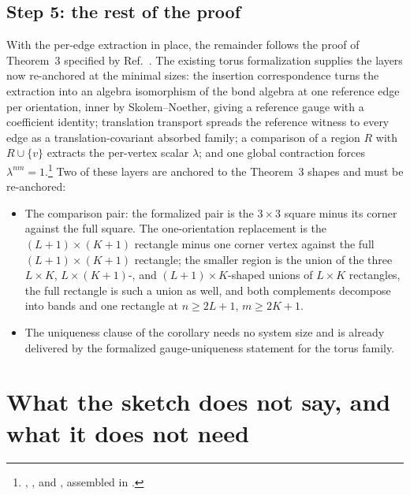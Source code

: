 \documentclass{article}
\begin{document}
\subsection{Step 5: the rest of the proof}

With the per-edge extraction in place, the remainder follows the proof of
Theorem~3 specified by Ref.~\cite{Molnar2018NormalPEPS}.  The existing torus
formalization supplies the layers now re-anchored at the minimal sizes: the insertion
correspondence turns the extraction into an algebra isomorphism of the
bond algebra at one reference edge per orientation, inner by
Skolem--Noether, giving a reference gauge with a coefficient identity;
translation transport spreads the reference witness to every edge as a
translation-covariant absorbed family; a comparison of a region $R$
with $R \cup \{v\}$ extracts the per-vertex scalar $\lambda$; and one
global contraction forces
$\lambda^{nm}=1$.\footnote{,
    , and
    , assembled in
    .} Two of these layers
are anchored to the Theorem~3 shapes and must be re-anchored:

\begin{itemize}
    \item The comparison pair: the formalized pair is the $3\times3$
          square minus its corner against the full square. The
          one-orientation replacement is the $(L+1)\times(K+1)$ rectangle
          minus one corner vertex against the full $(L+1)\times(K+1)$
          rectangle; the smaller region is the union of the three $L\times K$,
          $L\times(K+1)$-, and $(L+1)\times K$-shaped unions of $L \times K$
          rectangles, the full rectangle is such a union as well, and both
          complements decompose into bands and one rectangle at
          $n \geq 2L+1$, $m \geq 2K+1$.
    \item The uniqueness clause of the corollary needs no system size and
          is already delivered by the formalized gauge-uniqueness statement
          for the torus family.
\end{itemize}

\section{What the sketch does not say, and what it does not need}
\end{document}

